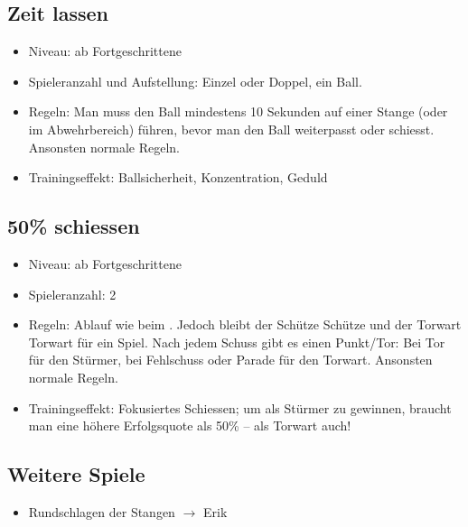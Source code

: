 \subsection{Zeit lassen}
\label{spielformen:sonderregeln:zeitlassen}

\begin{itemize}
\item Niveau: ab Fortgeschrittene
\item Spieleranzahl und Aufstellung: Einzel oder Doppel, ein Ball.
\item Regeln: 
Man muss den Ball mindestens 10 Sekunden auf einer Stange (oder im Abwehrbereich) führen, bevor man den Ball weiterpasst oder schiesst. 
Ansonsten normale Regeln.
\item Trainingseffekt: Ballsicherheit, Konzentration, Geduld 
\end{itemize}


\subsection{50\% schiessen}
\label{spielformen:sonderregeln:50schiessen}

\begin{itemize}
\item Niveau: ab Fortgeschrittene
\item Spieleranzahl: 2
\item Regeln: 
Ablauf wie beim . Jedoch bleibt der Schütze Schütze und der Torwart Torwart für ein Spiel. Nach jedem Schuss gibt es einen Punkt/Tor: Bei Tor für den Stürmer, bei Fehlschuss oder Parade für den Torwart.  
Ansonsten normale Regeln.
\item Trainingseffekt: Fokusiertes Schiessen; um als Stürmer zu gewinnen, braucht man eine höhere Erfolgsquote als 50\% -- als Torwart auch! 
\end{itemize}


\subsection{Weitere Spiele}
\label{spielformen:sonderregeln:weiteres}

\begin{itemize}
\item Rundschlagen der Stangen $\rightarrow$ Erik
\end{itemize}

